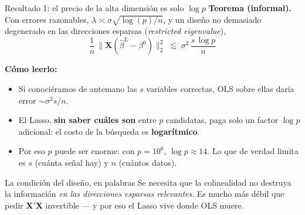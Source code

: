 \documentclass{beamer}
\newcommand{\1}{\mathbb{I}}
\begin{document}
\begin{frame}{Resultado 1: el precio de la alta dimensión es solo $\log p$}
\small
\textbf{Teorema (informal).} Con errores razonables, $\lambda \asymp \sigma\sqrt{\log(p)/n}$, y un diseño no demasiado degenerado en las direcciones esparsas (\emph{restricted eigenvalue}),
\[ \frac{1}{n}\, \big\| \mathbf{X}(\hat{\beta}^L - \beta^0) \big\|_2^2 \;\lesssim\; \sigma^2\, \frac{s \, \log p}{n} \]
\pause

\textbf{Cómo leerlo:}
\begin{itemize}\itemsep5pt
  \item Si conociéramos de antemano las $s$ variables correctas, OLS sobre ellas daría error $\sim \sigma^2 s / n$. \pause
  \item El Lasso, \textbf{sin saber cuáles son} entre $p$ candidatas, paga solo un factor $\log p$ adicional: el costo de la búsqueda es \textbf{logarítmico}. \pause
  \item Por eso $p$ puede ser enorme: con $p = 10^6$, $\log p \approx 14$. Lo que de verdad limita es $s$ (cuánta señal hay) y $n$ (cuántos datos).
\end{itemize}
\pause

\begin{block}{La condición del diseño, en palabras}
Se necesita que la colinealidad no destruya la información \emph{en las direcciones esparsas relevantes}. Es mucho más débil que pedir $\mathbf{X}'\mathbf{X}$ invertible --- y por eso el Lasso vive donde OLS muere.
\end{block}
\end{frame}
\end{document}
